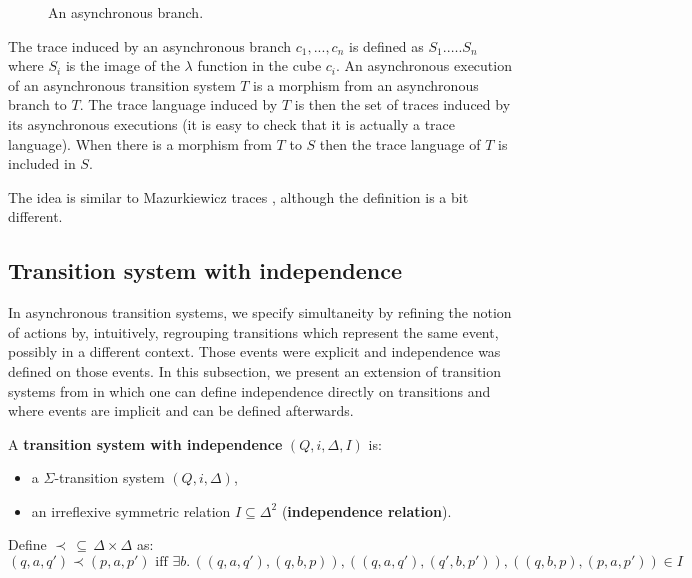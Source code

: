 		\begin{figure}[H]
			\begin{center}
    				
  			\end{center}
  			\caption{An asynchronous branch.}
		\end{figure}

The trace induced by an asynchronous branch $c_1, ..., c_n$ is defined as $S_1. \ldots . S_n$ where $S_i$ is the image of the $\lambda$ function in the cube $c_i$. An asynchronous execution of an asynchronous transition system $T$ is a morphism from an asynchronous branch to $T$. The trace language induced by $T$ is then the set of traces induced by its asynchronous executions (it is easy to check that it is actually a trace language). When there is a morphism from $T$ to $S$ then the trace language of $T$ is included in $S$.

The idea is similar to Mazurkiewicz traces \cite{mazurkiewicz89}, although the definition is a bit different.
	
	
	
	
	\subsection{Transition system with independence}
	\label{subsec:tsi}
	
	In asynchronous transition systems, we specify simultaneity by refining the notion of actions by, intuitively, regrouping transitions which represent the same event, possibly in a different context. Those events were explicit and independence was defined on those events. In this subsection, we present an extension of transition systems from \cite{nielsen94} in which one can define independence directly on transitions and where events are implicit and can be defined afterwards.
	
	A \textbf{transition system with independence} $(Q, i, \Delta, I)$ is:
		\begin{itemize}
			\item a $\Sigma$-transition system $(Q, i, \Delta)$,
			\item an irreflexive symmetric relation $I \subseteq \Delta^2$ (\textbf{independence relation}).
		\end{itemize}
	Define $\prec \,\subseteq \,\Delta\times\Delta$ as:
	$$(q,a,q') \prec (p,a,p') \text{ iff } \exists b.\, ((q,a,q'),(q,b,p)), ((q,a,q'),(q',b,p')), ((q,b,p),(p,a,p')) \in I$$
	
				\begin{figure}[H]
					\begin{center}
    						
  					\end{center}
				\end{figure}
	
